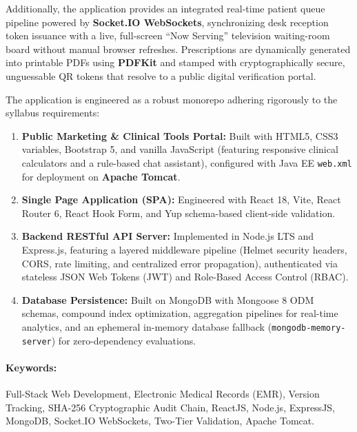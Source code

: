 \documentclass[12pt,a4paper,oneside]{report}
\begin{document}
Additionally, the application provides an integrated real-time patient queue pipeline powered by \textbf{Socket.IO WebSockets}, synchronizing desk reception token issuance with a live, full-screen ``Now Serving'' television waiting-room board without manual browser refreshes. Prescriptions are dynamically generated into printable PDFs using \textbf{PDFKit} and stamped with cryptographically secure, unguessable QR tokens that resolve to a public digital verification portal. 

The application is engineered as a robust monorepo adhering rigorously to the syllabus requirements:
\begin{enumerate}[noitemsep]
    \item \textbf{Public Marketing \& Clinical Tools Portal:} Built with HTML5, CSS3 variables, Bootstrap 5, and vanilla JavaScript (featuring responsive clinical calculators and a rule-based chat assistant), configured with Java EE \texttt{web.xml} for deployment on \textbf{Apache Tomcat}.
    \item \textbf{Single Page Application (SPA):} Engineered with React 18, Vite, React Router 6, React Hook Form, and Yup schema-based client-side validation.
    \item \textbf{Backend RESTful API Server:} Implemented in Node.js LTS and Express.js, featuring a layered middleware pipeline (Helmet security headers, CORS, rate limiting, and centralized error propagation), authenticated via stateless JSON Web Tokens (JWT) and Role-Based Access Control (RBAC).
    \item \textbf{Database Persistence:} Built on MongoDB with Mongoose 8 ODM schemas, compound index optimization, aggregation pipelines for real-time analytics, and an ephemeral in-memory database fallback (\texttt{mongodb-memory-server}) for zero-dependency evaluations.
\end{enumerate}

\paragraph{Keywords:} Full-Stack Web Development, Electronic Medical Records (EMR), Version Tracking, SHA-256 Cryptographic Audit Chain, ReactJS, Node.js, ExpressJS, MongoDB, Socket.IO WebSockets, Two-Tier Validation, Apache Tomcat.

\newpage
\tableofcontents
\newpage
\listoffigures
\listoftables
\end{document}
